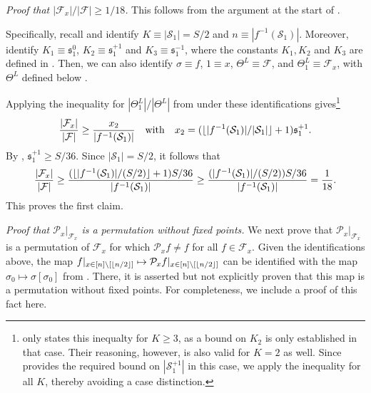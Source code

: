 \documentclass[11pt]{article}
\newcommand{\mf}[1]{\mathfrak{#1}}
\newcommand{\mcF}{\mathcal{F}}
\newcommand{\mcP}{\mathcal{P}}
\newcommand{\mcS}{\mathcal{S}}
\DeclarePairedDelimiter\floor{\lfloor}{\rfloor}
\theoremstyle{definition}
\theoremstyle{definition}
\begin{document}
\emph{Proof that $|\mcF_x|/|\mcF|\geq 1/18$.}
This follows from the argument at the start of \cite[Section 6.2]{zhang2016minimax}.

Specifically, recall  and identify $K\equiv |\mcS_1|=S/2$ and $n \equiv |f^{-1}(\mcS_1)|$.
Moreover, identify $K_1 \equiv \mf{s}_1^{0}$, $K_2 \equiv \mf{s}_1^{+1}$ and $K_3 \equiv \mf{s}_1^{-1}$, where the constants $K_1, K_2$ and $K_3$ are defined in \cite[Eqn. (5.1)]{zhang2016minimax}.
Then, we can also identify $\sigma \equiv f$, $1 \equiv x$, $\Theta^L \equiv \mcF$, and $\Theta_1^L\equiv \mcF_x$, with $\Theta^L$ defined below \cite[Eqn. (5.1)]{zhang2016minimax}.

Applying the inequality for $|\Theta_1^L|/|\Theta^L|$ from \cite[Section 6.2]{zhang2016minimax} under these identifications gives\footnote{\cite{zhang2016minimax} only states this inequalty for $K\geq 3$, as a bound on $K_2$ is only established in that case.
Their reasoning, however, is also valid for $K=2$ as well.
Since  provides the required bound on $|\mcS_1^{+1}|$ in this case, we apply the inequality for all $K$, thereby avoiding a case distinction.}
\begin{equation}
	\frac{|\mcF_x|}{|\mcF|}
	\geq
	\frac{x_2}{|f^{-1}(\mcS_1)|}
	\quad
	\mathrm{with}
	\quad
	x_2
	=
	(\floor{|f^{-1}(\mcS_1)|/|\mcS_1|}+1)\mf{s}_1^{+1}
	.
\end{equation}
By , $\mf{s}_1^{+1} \geq S/36$.
Since $|\mcS_1| = S/2$, it follows that
\begin{equation}
	\frac{|\mcF_x|}{|\mcF|}
	\geq
	\frac{(\floor{|f^{-1}(\mcS_1)|/(S/2)}+1)S/36}{|f^{-1}(\mcS_1)|}
	\geq
	\frac{(|f^{-1}(\mcS_1)|/(S/2))S/36}{|f^{-1}(\mcS_1)|}
	=
	\frac{1}{18}
	.
\end{equation}
This proves the first claim.

\emph{Proof that $\mcP_x|_{\mcF_x}$ is a permutation without fixed points.}
We next prove that $\mcP_x|_{\mcF_x}$ is a permutation of $\mcF_x$ for which $\mcP_xf\neq f$ for all $f\in \mcF_x$.
Given the identifications above, the map $f|_{x\in[n]\setminus[\floor{n/2}]}\mapsto \mcP_xf|_{x\in[n]\setminus[\floor{n/2}]}$ can be identified with the map $\sigma_0\mapsto \sigma[\sigma_0]$ from \cite[Section 6.2]{zhang2016minimax}.
There, it is asserted but not explicitly proven that this map is a permutation without fixed points.
For completeness, we include a proof of this fact here.
\end{document}
